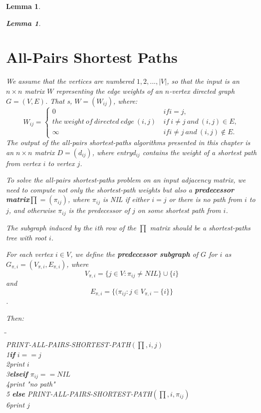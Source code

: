 \documentclass[a4paper,11pt]{book}
\newtheorem{lemma}[theorem]{Lemma}
\begin{document}
{\begin{lemma}
\begin{lemma}
\section{All-Pairs Shortest Paths}
We assume that the vertices are numbered $1,2,...,|V|$, so that the input is an $n\times n$ matrix $W$ representing the edge weights of an $n$-vertex directed graph $G=(V,E)$. That s, $W = (W_{ij})$, where:
\begin{equation}
W_{ij}=\begin{cases} 0 & if i=j,\\the\ weight\ of\ directed\ edge\ (i,j)\ & if\ i\neq j\ and\ (i, j)\in E,\\
\infty & if i \neq j\ and\ (i,j) \notin E. \end{cases}
\end{equation}
The output of the all-pairs shortest-paths algorithms presented in this chapter is an $n\times n$ matrix $D=(d_{ij})$, where entry$d_{ij}$ contains the weight of a shortest path from vertex $i$ to vertex $j$.

To solve the all-pairs shortest-paths problem on an input adjacency matrix, we need to compute not only the shortest-path weights but also a \textbf{predecessor matrix}$\prod = (\pi_{ij})$, where $\pi_{ij}$ is NIL if either $i = j$ or there is no path from $i$ to $j$, and otherwise $\pi_{ij}$ is the predecessor of $j$ on some shortest path from $i$.

The subgraph induced by the $i$th row of the $\prod$ matrix should be a shortest-paths tree with root $i$. 

For each vertex $i\in V$, we define the \textbf{predecessor subgraph} of $G$ for $i$ as $G_{\pi,i} = (V_{\pi,i},E_{\pi,i})$, where\[V_{\pi,i} = \{j\in V:\pi_{ij} \neq NIL\}\cup \{i\}\] and \[E_{\pi,i} = \{(\pi_{ij}:j \in V_{\pi,i}-\{i\}\}\].

Then:
\begin{tabbing}
\hspace{.8cm}\=\hspace{.8cm}\=\hspace{.8cm}\=\\
PRINT-ALL-PAIRS-SHORTEST-PATH$(\prod,i,j)$\\
1\>\textbf{if} $i==j$\\
2\>\>print $i$\\
3\>\textbf{elseif} $\pi_{ij} == NIL$\\
4\>\>print "no path"\\
5\> \textbf{else} PRINT-ALL-PAIRS-SHORTEST-PATH$(\prod,i,\pi_{ij})$\\
6\>\>print $j$
\end{tabbing}


\end{lemma}
\end{lemma}}
\end{document}
